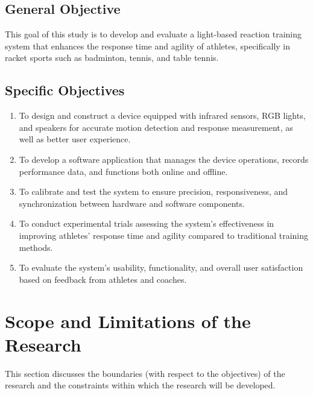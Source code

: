 \subsection{General Objective}
\label{sec:generalobjective}

This goal of this study is to develop and evaluate a light-based reaction training system that enhances the response time and agility of athletes, specifically in racket sports such as badminton, tennis, and table tennis.


\subsection{Specific Objectives}
\label{sec:specificobjectives}

\begin{enumerate}
   \item To design and construct a device equipped with infrared sensors, RGB lights, and speakers for accurate motion detection and response measurement, as well as better user experience.
   
   \item To develop a software application that manages the device operations, records performance data, and functions both online and offline.
   
   \item To calibrate and test the system to ensure precision, responsiveness, and synchronization between hardware and software components.
   
   \item To conduct experimental trials assessing the system’s effectiveness in improving athletes’ response time and agility compared to traditional training methods.
   
   \item To evaluate the system’s usability, functionality, and overall user satisfaction based on feedback from athletes and coaches.
\end{enumerate}


\section{Scope and Limitations of the Research}
\label{sec:scopelimitations}

This section discusses the boundaries (with respect to the objectives) of the research and the constraints within 
which the research will be developed.

\begin{comment}

%
%
Generally, one paragraph should be allotted for each of your research objectives.

Each paragraph contains a brief overview of the concept/theory and the purpose of doing the associated objective.

Each paragraph also includes a description of the scope/limitation of your study.

* Please refer to the slides for examples.

\end{comment}


